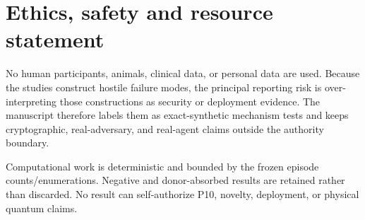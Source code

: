 \section{Ethics, safety and resource statement}

No human participants, animals, clinical data, or personal data are used. Because the studies construct hostile failure modes, the principal reporting risk is over-interpreting those constructions as security or deployment evidence. The manuscript therefore labels them as exact-synthetic mechanism tests and keeps cryptographic, real-adversary, and real-agent claims outside the authority boundary.

Computational work is deterministic and bounded by the frozen episode counts/enumerations. Negative and donor-absorbed results are retained rather than discarded. No result can self-authorize P10, novelty, deployment, or physical quantum claims.